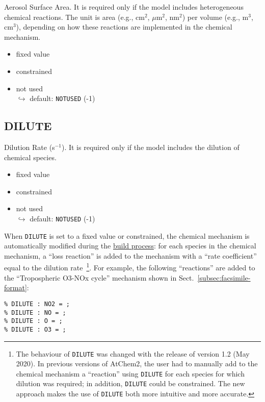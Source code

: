 Aerosol Surface Area. It is required only if the model includes
heterogeneous chemical reactions. The unit is area (e.g., cm$^2$,
$\mu$m$^2$, nm$^2$) per volume (e.g., m$^3$, cm$^3$), depending on how
these reactions are implemented in the chemical mechanism.

\begin{itemize}
\item fixed value
\item constrained
\item not used\\$\hookrightarrow$ default: \texttt{NOTUSED} (-1)
\end{itemize}

\subsection{DILUTE} \label{subsec:dilute}

Dilution Rate (s$^{-1}$). It is required only if the model includes
the dilution of chemical species.

\begin{itemize}
\item fixed value
\item constrained
\item not used\\$\hookrightarrow$ default: \texttt{NOTUSED} (-1)
\end{itemize}

When \texttt{DILUTE} is set to a fixed value or constrained, the
chemical mechanism is automatically modified during the
\hyperref[subsec:build-process]{build process}: for each species in
the chemical mechanism, a ``loss reaction'' is added to the mechanism
with a ``rate coefficient'' equal to the dilution rate~\footnote{The
  behaviour of \texttt{DILUTE} was changed with the release of version
  1.2 (May 2020). In previous versions of AtChem2, the user had to
  manually add to the chemical mechanism a ``reaction'' using
  \texttt{DILUTE} for each species for which dilution was required; in
  addition, \texttt{DILUTE} could be constrained. The new approach
  makes the use of \texttt{DILUTE} both more intuitive and more
  accurate.}. For example, the following ``reactions'' are added to
the ``Tropospheric O3-NOx cycle'' mechanism shown in
Sect.~\ref{subsec:facsimile-format}:

\begin{verbatim}
% DILUTE : NO2 = ;
% DILUTE : NO = ;
% DILUTE : O = ;
% DILUTE : O3 = ;
\end{verbatim}

